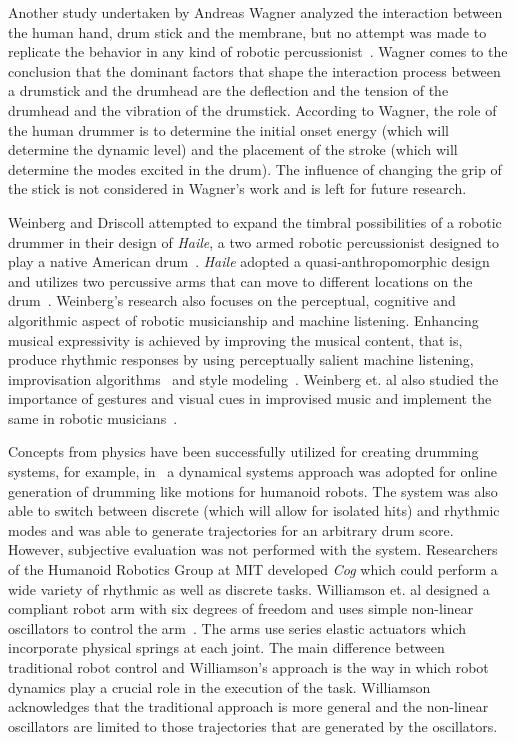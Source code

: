 \documentclass[final,1p,times]{elsarticle}
\begin{document}
Another study undertaken by Andreas Wagner analyzed the interaction between the human hand, drum stick and the membrane, but no attempt was made to replicate the behavior in any kind of robotic percussionist~\cite{wagner2006analysis}. Wagner comes to the conclusion that the dominant factors that shape the interaction process between a drumstick and the drumhead are the deflection and the tension of the drumhead and the vibration of the drumstick. According to Wagner, the role of the human drummer is to determine the initial onset energy (which will determine the dynamic level) and the placement of the stroke (which will determine the modes excited in the drum). The influence of changing the grip of the stick is not considered in Wagner's work and is left for future research.

Weinberg and Driscoll attempted to expand the timbral possibilities of
a robotic drummer in their design of \textit{Haile}, a two armed robotic percussionist designed to play a native American drum~\cite{weinberg2006robot}. \textit{Haile} adopted a quasi-anthropomorphic design and utilizes two percussive arms that can move to different locations on the drum~\cite{weinberg2005haile, weinberg2006toward}. Weinberg's research also focuses on the perceptual, cognitive and algorithmic aspect of robotic musicianship and machine listening. Enhancing musical expressivity is achieved by improving the musical content, that is, produce rhythmic responses by using perceptually salient machine listening, improvisation algorithms~\cite{weinberg2007real, weinberg2006jam} and style modeling~\cite{nikolaidis2010playing}. Weinberg et. al also studied the importance of gestures and visual cues in improvised music and implement the same in robotic musicians~\cite{weinberg2007real, weinberg2009interactive}.

Concepts from physics have been successfully utilized for creating drumming systems, for example, in~\cite{degallier2006movement} a dynamical systems approach was adopted for online generation of drumming like motions for humanoid robots. The system was also able to switch between discrete (which will allow for isolated hits) and rhythmic modes and was able to generate trajectories for an arbitrary drum score. However, subjective evaluation was not performed with the system. 
Researchers of the Humanoid Robotics Group at MIT developed \textit{Cog} which could perform a wide variety of rhythmic as well as discrete tasks. Williamson et. al designed a compliant robot arm with six degrees of freedom and uses simple non-linear oscillators to control the arm~\cite{brooks1999cog}. The arms use series elastic actuators which incorporate physical springs at each joint. The main difference between traditional robot control and Williamson's approach is the way in which robot dynamics play a crucial role in the execution of the task. Williamson acknowledges that the traditional approach is more general and the non-linear oscillators are limited to those trajectories that are generated by the oscillators.
\end{document}
